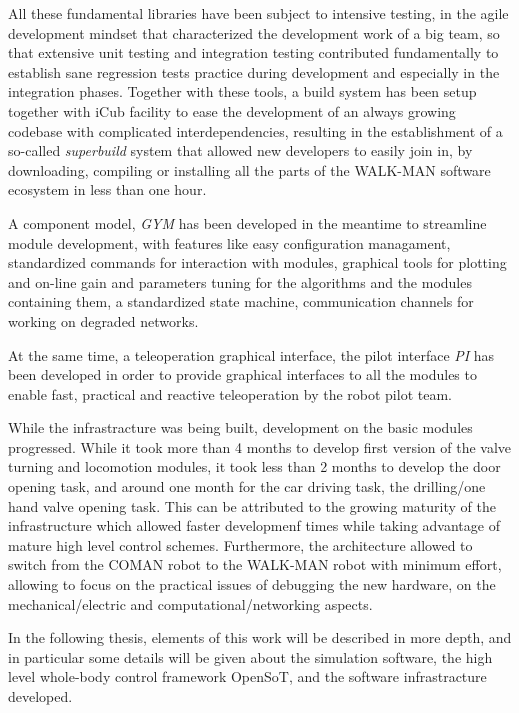 \documentclass[%
	paper=A4,					%
	twoside=true,				%
	openright,			.
	parskip=full,				%
	chapterprefix=true,			%
	11pt,						%
	headings=normal,			%
	bibliography=totoc,			%
	listof=totoc,				%
	titlepage=on,				%
	captions=tableabove,		%
	draft=false,				%
]{scrreprt}%
\begin{document}
All these fundamental libraries have been subject to intensive testing, in the agile development mindset that characterized the development work of a big team, so that extensive unit testing and integration testing contributed fundamentally to establish sane regression tests practice during development and especially in the integration phases. Together with these tools, a build system has been setup together with iCub facility to ease the development of an always growing codebase with complicated interdependencies, resulting in the establishment of a so-called \emph{superbuild} system that allowed new developers to easily join in, by downloading, compiling or installing all the parts of the WALK-MAN software ecosystem in less than one hour. 

A component model, \emph{GYM} has been developed in the meantime to streamline module development, with features like easy configuration managament, standardized commands for interaction with modules, graphical tools for plotting and on-line gain and parameters tuning for the algorithms and the modules containing them, a standardized state machine, communication channels for working on degraded networks. 

At the same time, a teleoperation graphical interface, the pilot interface \emph{PI} has been developed in order to provide graphical interfaces to all the modules to enable fast, practical and reactive teleoperation by the robot pilot team.

While the infrastracture was being built, development on the basic modules progressed. While it took more than 4 months to develop first version of the valve turning and locomotion modules, it took less than 2 months to develop the door opening task, and around one month for the car driving task, the drilling/one hand valve opening task. This can be attributed to the growing maturity of the infrastructure which allowed faster developmenf times while taking advantage of mature high level control schemes. Furthermore, the architecture allowed to switch from the COMAN robot to the WALK-MAN robot with minimum effort, allowing to focus on the practical issues of debugging the new hardware, on the mechanical/electric and computational/networking aspects.

In the following thesis, elements of this work will be described in more depth, and in particular some details will be given about the simulation software, the high level whole-body control framework OpenSoT, and the software infrastracture developed.
\end{document}
